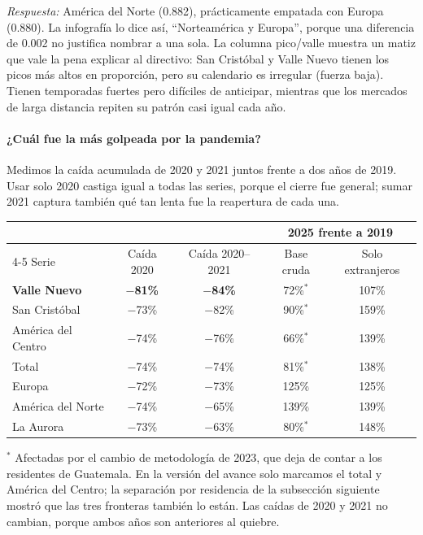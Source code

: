 \emph{Respuesta:} América del Norte (0.882), prácticamente empatada con Europa
(0.880). La infografía lo dice así, ``Norteamérica y Europa'', porque una
diferencia de 0.002 no justifica nombrar a una sola. La columna pico/valle
muestra un matiz que vale la pena explicar al directivo: San Cristóbal y Valle
Nuevo tienen los picos más altos en proporción, pero su calendario es irregular
(fuerza baja). Tienen temporadas fuertes pero difíciles de anticipar, mientras
que los mercados de larga distancia repiten su patrón casi igual cada año.

\paragraph{¿Cuál fue la más golpeada por la pandemia?} Medimos la caída
acumulada de 2020 y 2021 juntos frente a dos años de 2019. Usar solo 2020 castiga
igual a todas las series, porque el cierre fue general; sumar 2021 captura
también qué tan lenta fue la reapertura de cada una.

\begin{center}
\begin{tabular}{@{}lcccc@{}}
\toprule
 & & & \multicolumn{2}{c}{2025 frente a 2019} \\
\cmidrule(l){4-5}
Serie & Caída 2020 & Caída 2020--2021 & Base cruda & Solo extranjeros \\
\midrule
\textbf{Valle Nuevo} & \textbf{$-$81\%} & \textbf{$-$84\%} & 72\%$^{*}$ & 107\% \\
San Cristóbal        & $-$73\% & $-$82\% & 90\%$^{*}$  & 159\% \\
América del Centro   & $-$74\% & $-$76\% & 66\%$^{*}$  & 139\% \\
Total                & $-$74\% & $-$74\% & 81\%$^{*}$  & 138\% \\
Europa               & $-$72\% & $-$73\% & 125\%       & 125\% \\
América del Norte    & $-$74\% & $-$65\% & 139\%       & 139\% \\
La Aurora            & $-$73\% & $-$63\% & 80\%$^{*}$  & 148\% \\
\bottomrule
\end{tabular}

{\footnotesize $^{*}$ Afectadas por el cambio de metodología de 2023, que deja de
contar a los residentes de Guatemala. En la versión del avance solo marcamos el
total y América del Centro; la separación por residencia de la subsección
siguiente mostró que las tres fronteras también lo están. Las caídas de 2020 y
2021 no cambian, porque ambos años son anteriores al quiebre.}
\end{center}

